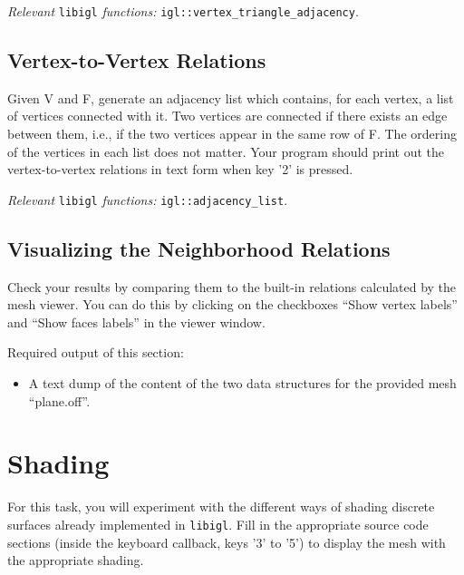 \documentclass[11pt]{amsart}
\begin{document}
\emph{Relevant} \texttt{libigl} \emph{functions: } \texttt{igl::vertex\_triangle\_adjacency}.

\subsection{Vertex-to-Vertex Relations}
Given V and F, generate an adjacency list which contains, for each vertex, a
list of vertices connected with it. Two vertices are connected if there exists
an edge between them, i.e., if the two vertices appear in the same row of F. The
ordering of the vertices in each list does not matter.  Your program should
print out the vertex-to-vertex relations in text form when key '2' is pressed.

\emph{Relevant} \texttt{libigl} \emph{functions: } \texttt{igl::adjacency\_list}.

\subsection{Visualizing the Neighborhood Relations}
Check your results by comparing them to the built-in relations calculated by the
mesh viewer. You can do this by clicking on the checkboxes ``Show vertex
labels'' and ``Show faces labels'' in the viewer window.
\vspace{0.5cm}

Required output of this section:
\begin{itemize}
\item{A text dump of the content of the two data structures for the provided
    mesh ``plane.off''.}
\end{itemize}

\section{Shading}
For this task, you will experiment with the different ways of shading discrete
surfaces already implemented in \texttt{libigl}. Fill in the appropriate source
code sections (inside the keyboard callback, keys '3' to '5') to display the
mesh with the appropriate shading.
\end{document}
